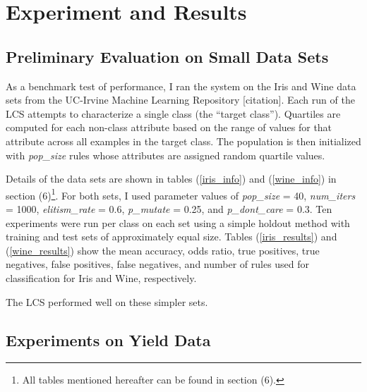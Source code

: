 \documentclass[11pt]{article}
\begin{document}
\section{Experiment and Results}

\subsection{Preliminary Evaluation on Small Data Sets}

As a benchmark test of performance, I ran the system on the Iris and Wine data sets from the UC-Irvine Machine Learning Repository [citation]. Each run of the LCS attempts to characterize a single class (the ``target class''). Quartiles are computed for each non-class attribute based on the range of values for that attribute across all examples in the target class. The population is then initialized with \textit{pop\_size} rules whose attributes are assigned random quartile values.

Details of the data sets are shown in tables (\ref{iris_info}) and (\ref{wine_info}) in section (6)\footnote{All tables mentioned hereafter can be found in section (6).}. For both sets, I used parameter values of \textit{pop\_size} = 40, \textit{num\_iters} = 1000, \textit{elitism\_rate} = 0.6, \textit{p\_mutate} = 0.25, and \textit{p\_dont\_care} = 0.3. Ten experiments were run per class on each set using a simple holdout method with training and test sets of approximately equal size. Tables (\ref{iris_results}) and (\ref{wine_results}) show the mean accuracy, odds ratio, true positives, true negatives, false positives, false negatives, and number of rules used for classification for Iris and Wine, respectively. 

The LCS performed well on these simpler sets.

\subsection{Experiments on Yield Data}
\end{document}
